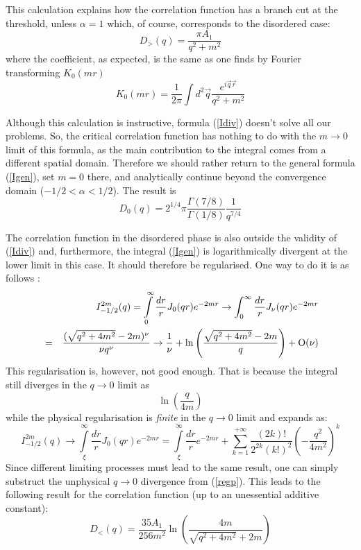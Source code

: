 This calculation explains how the correlation function
has a branch cut at the threshold, unless $\alpha=1$
which, of course, corresponds to the disordered case:
\begin{equation}
D_>(q)=\frac{\pi A_1}{q^2+m^2}
\label{Dorq}
\end{equation}
where the coefficient, as expected, is the
same as one finds by Fourier transforming $K_0(mr)$
\[
K_0(mr)=\frac{1}{2\pi}\int d^2 \vec{q}
\frac{e^{i\vec{q}\vec{r}}}{q^2+m^2}
\]

Although this calculation is
instructive, formula (\ref{Idiv}) doesn't solve all
our problems.
So, the critical correlation function has nothing
to do with the $m\to 0$ limit of this formula,
as the main contribution to the integral
comes from a different spatial domain.
Therefore we should rather return to the general
formula
(\ref{Igen}), set $m=0$ there, and analytically
continue beyond the convergence domain
($-1/2<\alpha<1/2$).
The result is
\begin{equation}
D_0(q)= 2^{1/4}\pi \frac{\Gamma(7/8)}{\Gamma(1/8)}
\frac{1}{q^{7/4}}
\label{Dnotq}
\end{equation}

The correlation function in the disordered phase
is also outside the validity of (\ref{Idiv}) and,
furthermore, the integral (\ref{Igen}) is
logarithmically
divergent at the lower limit in this case. It should
therefore be regularised.
One way to do it is as follows \cite{GR}:
\begin{eqnarray}
&~& I^{2m}_{-1/2}(q)=\int\limits_0^\infty \frac{dr}{r}
J_0(qr)e^{-2mr}\rightarrow \int_0^\infty \frac{dr}{r}
J_\nu(qr)
e^{-2mr} \nonumber\\
&=& \frac{(\sqrt{q^2+4m^2}-2m)^\nu}{\nu q^\nu}
\rightarrow \frac{1}{\nu}+\ln \left(
\frac{\sqrt{q^2+4m^2}-2m}{q}\right)+
{\rm O} (\nu)
\label{regp}
\end{eqnarray}
This regularisation is, however, not good enough. That
is because
the integral still diverges in the $q\to 0$ limit as
\[
\ln \left(\frac{q}{4m}\right)
\]
while the physical regularisation is {\it finite}
in the $q\to 0$ limit and expands as:
\begin{equation}
I^{2m}_{-1/2}(q)\rightarrow\int\limits_\xi^\infty
\frac{dr}{r}
J_0(qr)e^{-2mr}=\int\limits_\xi^\infty \frac{dr}{r}
e^{-2mr}+\sum\limits_{k=1}^{+\infty}\frac{(2k)!}{2^{2k}(k!)^2}
\left(-\frac{q^2}{4m^2}\right)^k
\label{regph}
\end{equation}
Since different limiting processes must lead to the
same
result, one can simply substruct the unphysical $q\to
0$
divergence from (\ref{regp}). This leads to the
following
result for the correlation function (up to an
unessential additive constant):
\begin{equation}
D_<(q)=\frac{35A_1}{256m^2}\ln\left(\frac{4m}{\sqrt{q^2+4m^2}+2m}
\right)
\label{Ddisq}
\end{equation}

